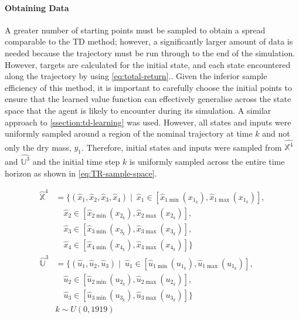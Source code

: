 \paragraph{Obtaining Data}
A greater number of starting points must be sampled to obtain a spread comparable to the TD method; however, a significantly larger amount of data is needed because the trajectory must be run through to the end of the simulation. However, targets are calculated for the initial state, and each state encountered along the trajectory by using \autoref{eq:total-return}.. Given the inferior sample efficiency of this method, it is important to carefully choose the initial points to ensure that the learned value function can effectively generalise across the state space that the agent is likely to encounter during its simulation. A similar approach to \autoref{ssection:td-learning} was used. However, all states and inputs were uniformly sampled around a region of the nominal trajectory at time $k$ and not only the dry mass, $y_1$. Therefore, initial states and inputs were sampled from $\hat{\mathbb{X}^4}$ and $\hat{\mathbb{U}^3}$ and the initial time step $k$ is uniformly sampled across the entire time horizon as shown in \autoref{eq:TR-sample-space}.

\begin{equation}\label{eq:TR-sample-space}
\begin{split}
    \hat{\mathbb{X}}^4 &= \{ (\hat{x}_1, \hat{x}_2, \hat{x}_3, \hat{x}_4) \mid\ \hat{x}_1 \in [\hat{x}_{1\min}(x_{1_k}), \hat{x}_{1\max}(x_{1_k})], \\
    &\quad \hat{x}_2 \in [\hat{x}_{2\min}(x_{2_k}), \hat{x}_{2\max}(x_{2_k})], \\
    &\quad \hat{x}_3 \in [\hat{x}_{3\min}(x_{3_k}), \hat{x}_{3\max}(x_{3_k})], \\
    &\quad \hat{x}_4 \in [\hat{x}_{4\min}(x_{4_k}), \hat{x}_{4\max}(x_{4_k})] \} \\
    \hat{\mathbb{U}}^3 &= \{ (\hat{u}_1, \hat{u}_2, \hat{u}_3) \mid\ \hat{u}_1 \in [\hat{u}_{1\min}(u_{1_k}), \hat{u}_{1\max}(u_{1_k})], \\
    &\quad \hat{u}_2 \in [\hat{u}_{2\min}(u_{2_k}), \hat{u}_{2\max}(u_{2_k})], \\
    &\quad \hat{u}_3 \in [\hat{u}_{3\min}(u_{3_k}), \hat{u}_{3\max}(u_{3_k})] \} \\
    & k \sim U(0,1919)  \\
\end{split}
\end{equation}

